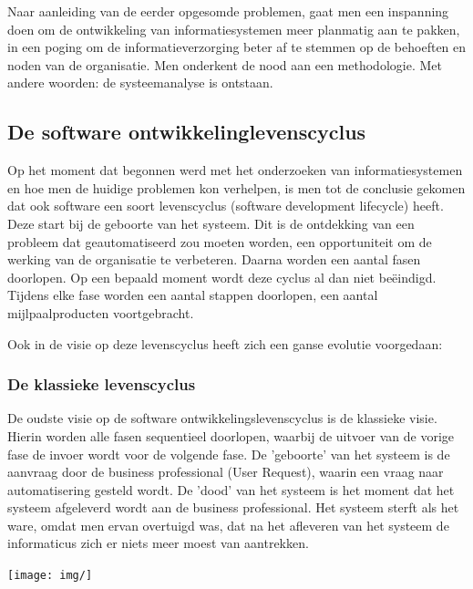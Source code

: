 Naar aanleiding van de eerder opgesomde problemen, gaat men een inspanning doen om de ontwikkeling van informatiesystemen meer planmatig aan te pakken, in een poging om de informatieverzorging beter af te stemmen op de behoeften en noden van de organisatie. Men onderkent de nood aan een methodologie. Met andere woorden: de systeemanalyse is ontstaan.

\subsection{De software ontwikkelinglevenscyclus}

Op het moment dat begonnen werd met het onderzoeken van informatiesystemen en hoe men de huidige problemen kon verhelpen, is men tot de conclusie gekomen dat ook software een soort levenscyclus (software development lifecycle) heeft. Deze start bij de geboorte van het systeem. Dit is de ontdekking van een probleem dat geautomatiseerd zou moeten worden, een opportuniteit om de werking van de organisatie te verbeteren. Daarna worden een aantal fasen doorlopen. Op een bepaald moment wordt deze cyclus al dan niet beëindigd.
Tijdens elke fase worden een aantal stappen doorlopen, een aantal mijlpaalproducten voortgebracht.

Ook in de visie op deze levenscyclus heeft zich een ganse evolutie voorgedaan:

\subsubsection{De klassieke levenscyclus}

De oudste visie op de software ontwikkelingslevenscyclus is de klassieke visie. Hierin worden alle fasen sequentieel doorlopen, waarbij de uitvoer van de vorige fase de invoer wordt voor de volgende fase. De 'geboorte' van het systeem is de aanvraag door de business professional (User Request), waarin een vraag naar automatisering gesteld wordt. De 'dood' van het systeem is het moment dat het systeem afgeleverd wordt aan de business professional. Het systeem sterft als het ware, omdat men ervan overtuigd was, dat na het afleveren van het systeem de informaticus zich er niets meer moest van aantrekken.


\begin{center}
\texttt{[image: img/]}%
\label{labelname}%
\end{center}


